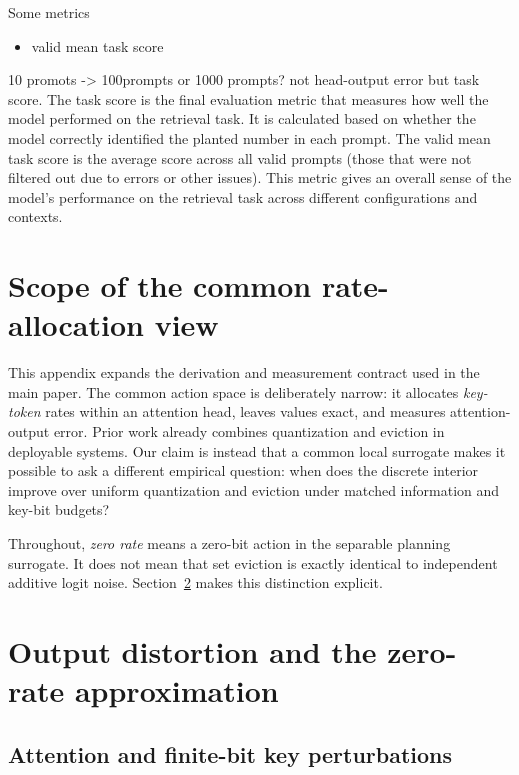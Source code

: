 Some metrics
\begin{itemize}
    \item valid mean task score
\end{itemize}

10 promots -> 100prompts or 1000 prompts? 
not  head-output error but task score.  The task score is the final evaluation metric that measures how well the model performed on the retrieval task. It is calculated based on whether the model correctly identified the planted number in each prompt. The valid mean task score is the average score across all valid prompts (those that were not filtered out due to errors or other issues). This metric gives an overall sense of the model's performance on the retrieval task across different configurations and contexts.


\section{Scope of the common rate-allocation view}
\label{app:scope}

This appendix expands the derivation and measurement contract used in the main
paper.  The common action space is deliberately narrow: it allocates
\emph{key-token} rates within an attention head, leaves values exact, and measures
attention-output error.  Prior work already combines quantization and eviction
in deployable systems.  Our claim is instead that a common local surrogate makes
it possible to ask a different empirical question: when does the discrete
interior improve over uniform quantization and eviction under matched
information and key-bit budgets?

Throughout, \emph{zero rate} means a zero-bit action in the separable planning
surrogate.  It does not mean that set eviction is exactly identical to
independent additive logit noise.  Section~\ref{app:derivation} makes this
distinction explicit.

\section{Output distortion and the zero-rate approximation}
\label{app:derivation}

\subsection{Attention and finite-bit key perturbations}

